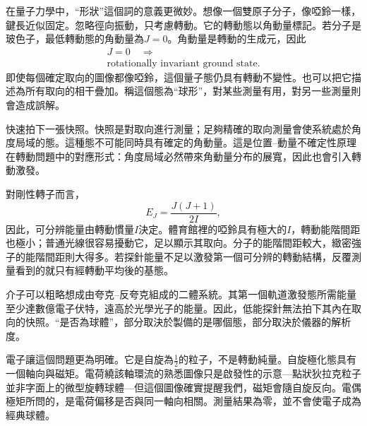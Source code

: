 在量子力學中，``形狀''這個詞的意義更微妙。想像一個雙原子分子，像啞鈴一樣，鍵長近似固定。忽略徑向振動，只考慮轉動。它的轉動態以角動量標記。若分子是玻色子，最低轉動態的角動量為\(J=0\)。角動量是轉動的生成元，因此
\begin{equation}
\begin{gathered}
J=0 \quad\Longrightarrow\\
\text{rotationally invariant ground state.}
\end{gathered}
\end{equation}
即使每個確定取向的圖像都像啞鈴，這個量子態仍具有轉動不變性。也可以把它描述為所有取向的相干疊加。稱這個態為``球形''，對某些測量有用，對另一些測量則會造成誤解。

快速拍下一張快照。快照是對取向進行測量；足夠精確的取向測量會使系統處於角度局域的態。這種態不可能同時具有確定的角動量。這是位置--動量不確定性原理在轉動問題中的對應形式：角度局域必然帶來角動量分布的展寬，因此也會引入轉動激發。

對剛性轉子而言，
\begin{equation}
E_J=\frac{J(J+1)}{2I},
\end{equation}
因此，可分辨能量由轉動慣量\(I\)決定。體育館裡的啞鈴具有極大的\(I\)，轉動能階間距也極小；普通光線很容易擾動它，足以顯示其取向。分子的能階間距較大，緻密強子的能階間距則大得多。若探針能量不足以激發第一個可分辨的轉動結構，反覆測量看到的就只有經轉動平均後的基態。

介子可以粗略想成由夸克--反夸克組成的二體系統。其第一個軌道激發態所需能量至少達數億電子伏特，遠高於光學光子的能量。因此，低能探針無法拍下其內在取向的快照。``是否為球體''，部分取決於製備的是哪個態，部分取決於儀器的解析度。

電子讓這個問題更為明確。它是自旋為\(\tfrac12\)的粒子，不是轉動純量。自旋極化態具有一個軸向與磁矩。電荷繞該軸環流的熟悉圖像只是啟發性的示意---點狀狄拉克粒子並非字面上的微型旋轉球體---但這個圖像確實提醒我們，磁矩會隨自旋反向。電偶極矩所問的，是電荷偏移是否與同一軸向相關。測量結果為零，並不會使電子成為經典球體。

\begin{classroomqa}
\end{classroomqa}

\begin{classroomqa}
\end{classroomqa}

